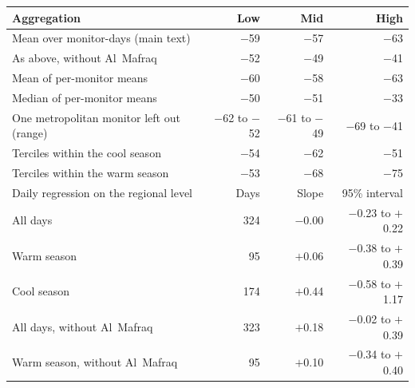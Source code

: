 \begin{tabular}{lrrr}
\toprule
Aggregation & Low & Mid & High \\
\midrule
Mean over monitor-days (main text) & $-$59 & $-$57 & $-$63 \\
As above, without Al~Mafraq & $-$52 & $-$49 & $-$41 \\
Mean of per-monitor means & $-$60 & $-$58 & $-$63 \\
Median of per-monitor means & $-$50 & $-$51 & $-$33 \\
One metropolitan monitor left out (range) & $-$62 to $-$52 & $-$61 to $-$49 & $-$69 to $-$41 \\
Terciles within the cool season & $-$54 & $-$62 & $-$51 \\
Terciles within the warm season & $-$53 & $-$68 & $-$75 \\
\midrule
Daily regression on the regional level & Days & Slope & 95\% interval \\
\midrule
All days & 324 & $-$0.00 & $-$0.23 to $+$0.22 \\
Warm season & 95 & $+$0.06 & $-$0.38 to $+$0.39 \\
Cool season & 174 & $+$0.44 & $-$0.58 to $+$1.17 \\
All days, without Al~Mafraq & 323 & $+$0.18 & $-$0.02 to $+$0.39 \\
Warm season, without Al~Mafraq & 95 & $+$0.10 & $-$0.34 to $+$0.40 \\
\bottomrule
\end{tabular}
